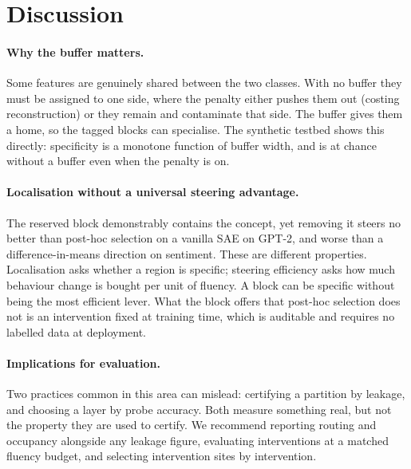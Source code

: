 \documentclass[11pt,a4paper]{article}
\theoremstyle{remark}
\begin{document}
\FloatBarrier
\section{Discussion}
\label{sec:discussion}

\paragraph{Why the buffer matters.}
Some features are genuinely shared between the two classes. With no buffer they must be assigned
to one side, where the penalty either pushes them out (costing reconstruction) or they remain and
contaminate that side. The buffer gives them a home, so the tagged blocks can specialise. The
synthetic testbed shows this directly: specificity is a monotone function of buffer width, and is
at chance without a buffer even when the penalty is on.

\paragraph{Localisation without a universal steering advantage.}
The reserved block demonstrably contains the concept, yet removing it steers no better than
post-hoc selection on a vanilla SAE on GPT-2, and worse than a difference-in-means direction
on sentiment. These are
different properties. Localisation asks whether a region is specific; steering efficiency asks
how much behaviour change is bought per unit of fluency. A block can be specific without being the
most efficient lever. What the block offers that post-hoc selection does not is an intervention
fixed at training time, which is auditable and requires no labelled data at deployment.

\paragraph{Implications for evaluation.}
Two practices common in this area can mislead: certifying a partition by leakage, and choosing a
layer by probe accuracy. Both measure something real, but not the property they are used to
certify. We recommend reporting routing and occupancy alongside any leakage figure, evaluating
interventions at a matched fluency budget, and selecting intervention sites by intervention.

\FloatBarrier
\end{document}
